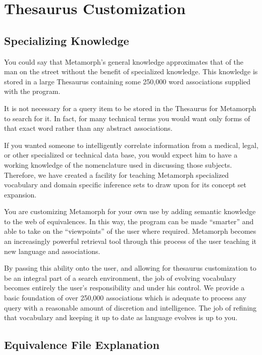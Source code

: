 \chapter{Thesaurus Customization}

\section{Specializing Knowledge}

You could say that Metamorph's general knowledge approximates that of
the man on the street without the benefit of specialized knowledge.
This knowledge is stored in a large Thesaurus containing some 250,000
word associations supplied with the program.

It is not necessary for a query item to be stored in the Thesaurus for
Metamorph to search for it.  In fact, for many technical terms you
would want only forms of that exact word rather than any abstract
associations.

If you wanted someone to intelligently correlate information from a
medical, legal, or other specialized or technical data base, you would
expect him to have a working knowledge of the nomenclature used in
discussing those subjects.  Therefore, we have created a facility for
teaching Metamorph specialized vocabulary and domain specific
inference sets to draw upon for its concept set expansion.

You are customizing Metamorph for your own use by adding semantic
knowledge to the web of equivalences.  In this way, the program can be
made ``smarter'' and able to take on the ``viewpoints'' of the user
where required.  Metamorph becomes an increasingly powerful retrieval
tool through this process of the user teaching it new language and
associations.

By passing this ability onto the user, and allowing for thesaurus
customization to be an integral part of a search environment, the job
of evolving vocabulary becomes entirely the user's responsibility and
under his control.  We provide a basic foundation of over 250,000
associations which is adequate to process any query with a reasonable
amount of discretion and intelligence.  The job of refining that
vocabulary and keeping it up to date as language evolves is up to you.

\section{Equivalence File Explanation}

